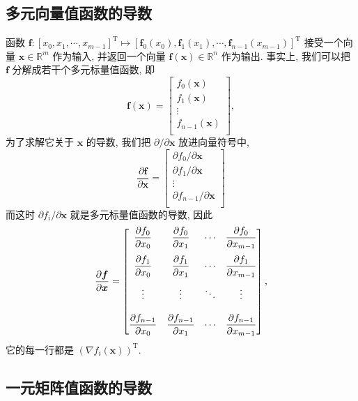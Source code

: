 \documentclass[10pt,UTF8]{book} %
\begin{document}
\subsection{多元向量值函数的导数}

函数 $\boldsymbol{f}: [x_0, x_1, \cdots, x_{m-1}]^\mathrm{T} \mapsto 
[\boldsymbol{f}_0(x_0), \boldsymbol{f}_1(x_1), \cdots, \boldsymbol{f}_{n-1}(x_{m-1})]^\mathrm{T}$
接受一个向量 $\boldsymbol{x} \in \mathbb{R}^m$ 作为输入, 并返回一个向量
$\boldsymbol{f}(\boldsymbol{x}) \in \mathbb{R}^n$ 作为输出.
事实上, 我们可以把 $\boldsymbol{f}$ 分解成若干个多元标量值函数,
即
\[ \boldsymbol{f}(\boldsymbol{x})
= \begin{bmatrix}
    f_0(\boldsymbol{x}) \\
    f_1(\boldsymbol{x}) \\
    \vdots \\ 
    f_{n-1}(\boldsymbol{x}) \\
\end{bmatrix}, \]
为了求解它关于 $\boldsymbol{x}$ 的导数, 我们把 $\partial / \partial \boldsymbol{x}$
放进向量符号中,
\[ \dfrac{\partial \boldsymbol{f}}{\partial \boldsymbol{x}}
= \begin{bmatrix}
    \partial f_0 / \partial \boldsymbol{x} \\
    \partial f_1 / \partial \boldsymbol{x}\\
    \vdots \\ 
    \partial f_{n-1} / \partial \boldsymbol{x} \\
\end{bmatrix} \]
而这时 $\partial f_i / \partial \boldsymbol{x}$ 就是多元标量值函数的导数,
因此
\[ \dfrac{\partial \boldsymbol{f}}{\partial \boldsymbol{x}}
= \begin{bmatrix}
    \dfrac{\partial f_0}{\partial x_0} & \dfrac{\partial f_0}{\partial x_1} & \cdots & \dfrac{\partial f_0}{\partial x_{m-1}} \\[\bigskipamount]
    \dfrac{\partial f_1}{\partial x_0} & \dfrac{\partial f_1}{\partial x_1} & \cdots & \dfrac{\partial f_1}{\partial x_{m-1}} \\[\bigskipamount]
    \vdots & \vdots & \ddots & \vdots \\[\bigskipamount]
    \dfrac{\partial f_{n-1}}{\partial x_0} & \dfrac{\partial f_{n-1}}{\partial x_1} & \cdots & \dfrac{\partial f_{n-1}}{\partial x_{m-1}}
\end{bmatrix}, \]
它的每一行都是 $\left(\nabla f_i(\boldsymbol{x})\right)^\mathrm{T}$.

\subsection{一元矩阵值函数的导数}
\end{document}
